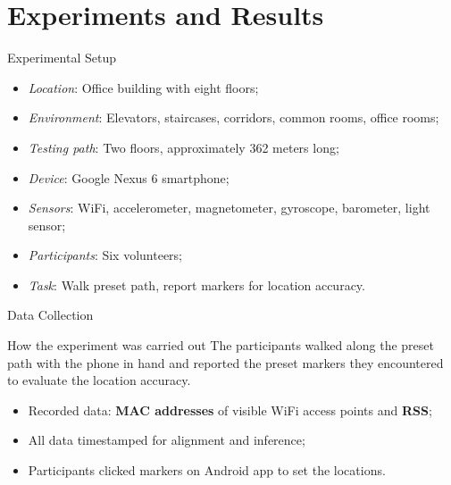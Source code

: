 \section[Results]{Experiments and Results}
\begin{frame}{Experimental Setup}
    \begin{itemize}
        \item \textit{Location}: Office building with eight floors;
        \item \textit{Environment}: Elevators, staircases, corridors, common rooms, office rooms;
        \item \textit{Testing path}: Two floors, approximately 362 meters long;
        \item \textit{Device}: Google Nexus 6 smartphone;
        \item \textit{Sensors}: WiFi, accelerometer, magnetometer, gyroscope, barometer, light sensor;
        \item \textit{Participants}: Six volunteers;
        \item \textit{Task}: Walk preset path, report markers for location accuracy.
    \end{itemize}
\end{frame}

\begin{frame}{Data Collection}
    \begin{block}{How the experiment was carried out}
        The participants walked along the preset path with the phone in hand and reported the preset markers they encountered to evaluate the location accuracy.
    \end{block}
    \begin{itemize}
        \item Recorded data: \textbf{MAC addresses} of visible WiFi access points and \textbf{RSS};
        \item All data timestamped for alignment and inference;
        \item Participants clicked markers on Android app to set the locations.
    \end{itemize}
\end{frame}

